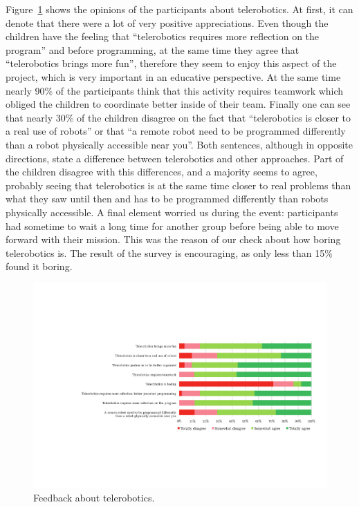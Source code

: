 \documentclass{intech-journal}
\begin{document}
Figure~\ref{fig:tele} shows the opinions of the participants about telerobotics. 
At first, it can denote that there were a lot of very positive appreciations. 
Even though the children have the feeling that ``telerobotics requires more reflection on the program'' and before programming, at the same time they agree that ``telerobotics brings more fun'', therefore they seem to enjoy this aspect of the project, which is very important in an educative perspective. 
At the same time nearly 90\% of the participants think that this activity requires teamwork which obliged the children to coordinate better inside of their team. 
Finally one can see that nearly 30\% of the children disagree on the fact that ``telerobotics is closer to a real use of robots'' or that ``a remote robot need to be programmed differently than a robot physically accessible near you''. 
Both sentences, although in opposite directions, state a difference between telerobotics and other approaches.
Part of the children disagree with this differences, and a majority seems to agree, probably seeing that telerobotics is at the same time closer to real problems than what they saw until then and has to be programmed differently than robots physically accessible.
A final element worried us during the event: participants had sometime to wait a long time for another group before being able to move forward with their mission. 
This was the reason of our check about how boring telerobotics is.
The result of the survey is encouraging, as only less than 15\% found it boring.


\begin{figure}[ht]
 \centering
    \includegraphics[width=\columnwidth]{figures/telerobotics.pdf}
  \caption{Feedback about telerobotics.}
  \label{fig:tele} 
\end{figure}
\end{document}

